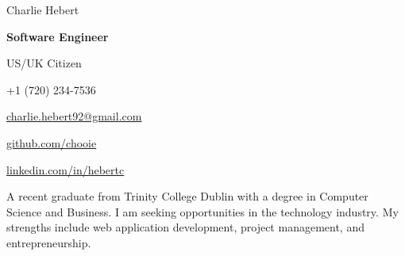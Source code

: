 \begin{center}
  {\Huge Charlie Hebert}
  
  \textbf{Software Engineer}

  US/UK Citizen
\end{center}

\noindent
\begin{minipage}[t]{0.5\textwidth}
  \begin{description}
    \raggedright
    \item[Mobile] +1 (720) 234-7536
    \item[Email] \href{mailto:charlie.hebert92@gmail.com}{charlie.hebert92@gmail.com}
  \end{description}
\end{minipage}
\noindent
\noindent
\begin{minipage}[t]{0.5\textwidth}
  \begin{description}
    \raggedleft
    \item[Github] \href{http://www.github.com/chooie}{github.com/chooie}
    \item[LinkedIn] \href{http://linkedin.com/in/hebertc}{linkedin.com/in/hebertc}
  \end{description}
\end{minipage}
\noindent

\begin{center}
  A recent graduate from Trinity College Dublin with a degree in Computer Science and Business. I am seeking opportunities in the technology industry. My strengths include web application development, project management, and entrepreneurship.
\end{center}

